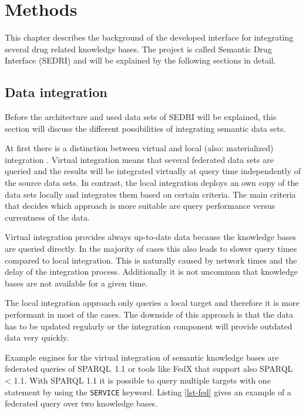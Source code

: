 \chapter{Methods}
\label{cha:methods}

This chapter describes the background of the developed interface for integrating several drug related knowledge bases.
The project is called Semantic Drug Interface (SEDRI) and will be explained by the following sections in detail.

\section{Data integration}
\label{sec:data-integration}

Before the architecture and used data sets of SEDRI will be explained, this section will discuss the different possibilities of integrating semantic data sets.

At first there is a distinction between virtual and local (also: materialized) integration \cite{lenzerini2002data}.
Virtual integration means that several federated data sets are queried and the results will be integrated virtually at query time independently of the source data sets.
In contrast, the local integration deploys an own copy of the data sets locally and integrates them based on certain criteria.
The main criteria that decides which approach is more suitable are query performance versus currentness of the data.

Virtual integration provides always up-to-date data because the knowledge bases are queried directly.
In the majority of cases this also leads to slower query times compared to local integration.
This is naturally caused by network times and the delay of the integration process.
Additionally it is not uncommon that knowledge bases are not available for a given time.

The local integration approach only queries a local target and therefore it is more performant in most of the cases.
The downside of this approach is that the data has to be updated regularly or the integration component will provide outdated data very quickly.

Example engines for the virtual integration of semantic knowledge bases are federated queries of SPARQL~1.1 or tools like FedX \cite{schwarte2011fedx} that support also SPARQL < 1.1.
With SPARQL 1.1 it is possible to query multiple targets with one statement by using the \texttt{SERVICE} keyword.
Listing \ref{lst-fed} gives an example of a federated query over two knowledge bases.

